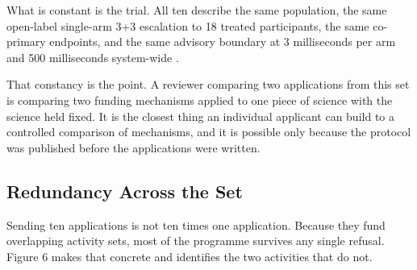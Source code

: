 What is constant is the trial. All ten describe the same population, the same
open-label single-arm 3+3 escalation to 18 treated participants, the same
co-primary endpoints, and the same advisory boundary at 3 milliseconds per arm
and 500 milliseconds system-wide \cite{onpremwhippl,phase1ind}.

That constancy is the point. A reviewer comparing two applications from this set
is comparing two funding mechanisms applied to one piece of science with the
science held fixed. It is the closest thing an individual applicant can build to
a controlled comparison of mechanisms, and it is possible only because the
protocol was published before the applications were written.

\subsection{Redundancy Across the Set}

Sending ten applications is not ten times one application. Because they fund
overlapping activity sets, most of the programme survives any single refusal.
Figure 6 makes that concrete and identifies the two activities that do not.

